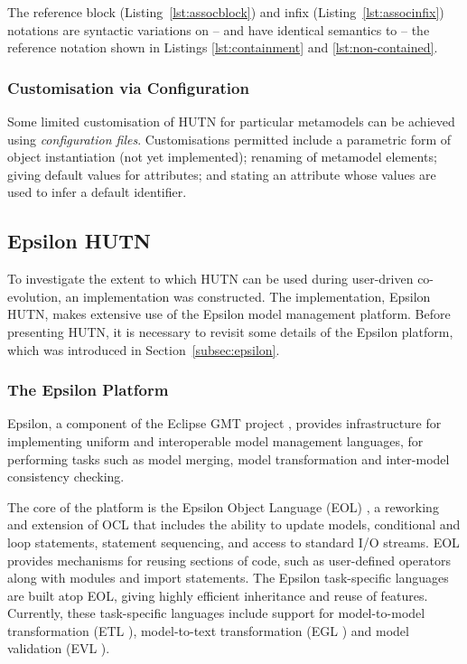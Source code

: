 The reference block (Listing~\ref{lst:assocblock}) and infix (Listing~\ref{lst:associnfix}) notations are syntactic variations on -- and have identical semantics to -- the reference notation shown in Listings \ref{lst:containment} and \ref{lst:non-contained}.


\subsubsection{Customisation via Configuration}
Some limited customisation of HUTN for particular metamodels can be achieved using \emph{configuration files}. Customisations permitted include a parametric form of object instantiation (not yet implemented); renaming of metamodel elements; giving default values for attributes; and stating an attribute whose values are used to infer a default identifier.


\subsection{Epsilon HUTN}
To investigate the extent to which HUTN can be used during user-driven co-evolution, an implementation was constructed. The implementation, Epsilon HUTN, makes extensive use of the Epsilon model management platform. Before presenting HUTN, it is necessary to revisit some details of the Epsilon \cite{kolovos09thesis} platform, which was introduced in Section~\ref{subsec:epsilon}.

\subsubsection{The Epsilon Platform}
Epsilon, a component of the Eclipse GMT project \cite{gmt}, provides infrastructure for implementing uniform and interoperable model management languages, for performing tasks such as model merging, model transformation and inter-model consistency checking. 

The core of the platform is the Epsilon Object Language (EOL) \cite{kolovos06eol}, a reworking and extension of OCL that includes the ability to update models, conditional and loop statements, statement sequencing, and access to standard I/O streams. EOL provides mechanisms for reusing sections of code, such as user-defined operators along with modules and import statements. The Epsilon task-specific languages are built atop EOL, giving highly efficient inheritance and reuse of features. Currently, these task-specific languages include support for model-to-model transformation (ETL \cite{kolovos08etl}), model-to-text transformation (EGL \cite{rose08egl}) and model validation (EVL \cite{kolovos08evl}).


